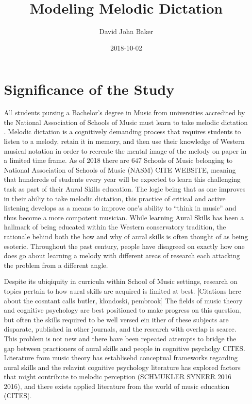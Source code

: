 \documentclass[]{book}
\title{Modeling Melodic Dictation}
\author{David John Baker}
\date{2018-10-02}
\theoremstyle{definition}
\theoremstyle{definition}
\theoremstyle{definition}
\theoremstyle{remark}
\begin{document}
\maketitle

{
\setcounter{tocdepth}{1}
\tableofcontents
}
\hypertarget{significance-of-the-study}{%
\chapter{Significance of the Study}\label{significance-of-the-study}}

All students pursing a Bachelor's degree in Music from universities
accredited by the National Association of Schools of Music must learn to
take melodic dictation \citep[ Section
VIII.6.B.2.A]{NationalAssociationSchools2018}. Melodic dictation is a
cognitively demanding process that requires students to listen to a
melody, retain it in memory, and then use their knowledge of Western
musical notation in order to recreate the mental image of the melody on
paper in a limited time frame. As of 2018 there are 647 Schools of Music
belonging to National Association of Schools of Music (NASM) CITE
WEBSITE, meaning that hundereds of students every year will be expected
to learn this challenging task as part of their Aural Skills education.
The logic being that as one improves in their abiliy to take melodic
dictation, this practice of critical and active listening develops as a
means to improve one's ability to ``think in music'' and thus become a
more compotent musician. While learning Aural Skills has been a hallmark
of being educated within the Western conservatory tradition, the
rationale behind both the how and why of aural skills is often thought
of as being esoteric. Throughout the past century, people have disagreed
on exactly how one does go about learning a melody with different areas
of research each attacking the problem from a different angle.

Despite its ubiqiquity in curricula within School of Music settings,
research on topics pertain to how aural skills are acquired is limited
at best. {[}Citations here about the cosntant calls butler, klondoski,
pembrook{]} The fields of music theory and cognitive psychology are best
positioned to make progress on this question, but often the skills
required to be well versed ein ither of these subjects are disparate,
published in other journals, and the research with overlap is scarce.
This problem is not new and there have been repeated attempts to bridge
the gap between practioners of aural skills and people in cognitive
psycholgy CITES. Literature from music theory has establisehd conceptual
frameworks regarding aural skills
\citet{karpinskiAuralSkillsAcquisition2000} and the relavint cognitive
psychology literature has explored factors that might contribute to
melodic perception (SCHMUKLER SYNERR 2016 2016), and there exists
applied literature from the world of music education (CITES).
\end{document}
